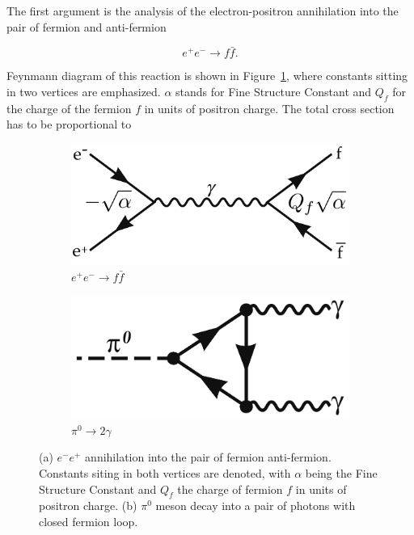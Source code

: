 The first argument is the analysis of the electron-positron annihilation into the
pair of fermion and anti-fermion

\begin{equation}
  e^+e^- \rightarrow f\bar{f}.
  \label{ElectronPositronAnihilation}
\end{equation}

Feynmann diagram of this reaction is shown in Figure~\ref{fig:RRatio}, where
constants sitting in two vertices are emphasized.  $\alpha$ stands for Fine
Structure Constant and $Q_f$ for the charge of the fermion $f$ in units of positron
charge. The total cross section has to be proportional to

\begin{figure}[t]
  \centering
  \begin{subfigure}[b]{0.45\textwidth}
    \includegraphics[width=\textwidth]{Chapter1/RRatio.png} 
    \caption{$e^+e^- \rightarrow f\bar{f}$}
    \label{fig:RRatio}
  \end{subfigure}
  \quad
  \begin{subfigure}[b]{0.45\textwidth}
    \includegraphics[width=\textwidth]{Chapter1/PiMesonDecay.png}
    \caption{$\pi^0 \rightarrow 2 \gamma$}
    \label{fig:PiDecay}
  \end{subfigure}
  \caption{(a) $e^-e^+$ annihilation into the pair of fermion anti-fermion.
    Constants siting in both vertices are denoted, with $\alpha$ being the Fine
    Structure Constant and $Q_f$ the charge of fermion $f$ in units of positron
    charge.
           (b) $\pi^0$ meson decay into a pair of photons with closed fermion
         loop.}
  \label{fig:FeynmannGraphsNC3}
\end{figure}

